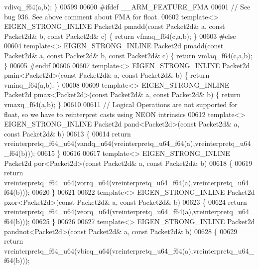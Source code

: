 \begin{DoxyCode}
{{      vdivq\_f64(a,b); \}
00599 
00600 \textcolor{preprocessor}{#ifdef \_\_ARM\_FEATURE\_FMA}
00601 \textcolor{comment}{// See bug 936. See above comment about FMA for float.}
00602 \textcolor{keyword}{template}<> EIGEN\_STRONG\_INLINE Packet2d pmadd(\textcolor{keyword}{const} Packet2d& a, \textcolor{keyword}{const} Packet2d& b, \textcolor{keyword}{const} Packet2d& c) \{ \textcolor{keywordflow}{
      return} vfmaq\_f64(c,a,b); \}
00603 \textcolor{preprocessor}{#else}
00604 \textcolor{keyword}{template}<> EIGEN\_STRONG\_INLINE Packet2d pmadd(\textcolor{keyword}{const} Packet2d& a, \textcolor{keyword}{const} Packet2d& b, \textcolor{keyword}{const} Packet2d& c) \{ \textcolor{keywordflow}{
      return} vmlaq\_f64(c,a,b); \}
00605 \textcolor{preprocessor}{#endif}
00606 
00607 \textcolor{keyword}{template}<> EIGEN\_STRONG\_INLINE Packet2d pmin<Packet2d>(\textcolor{keyword}{const} Packet2d& a, \textcolor{keyword}{const} Packet2d& b) \{ \textcolor{keywordflow}{return} 
      vminq\_f64(a,b); \}
00608 
00609 \textcolor{keyword}{template}<> EIGEN\_STRONG\_INLINE Packet2d pmax<Packet2d>(\textcolor{keyword}{const} Packet2d& a, \textcolor{keyword}{const} Packet2d& b) \{ \textcolor{keywordflow}{return} 
      vmaxq\_f64(a,b); \}
00610 
00611 \textcolor{comment}{// Logical Operations are not supported for float, so we have to reinterpret casts using NEON intrinsics}
00612 \textcolor{keyword}{template}<> EIGEN\_STRONG\_INLINE Packet2d pand<Packet2d>(\textcolor{keyword}{const} Packet2d& a, \textcolor{keyword}{const} Packet2d& b)
00613 \{
00614   \textcolor{keywordflow}{return} vreinterpretq\_f64\_u64(vandq\_u64(vreinterpretq\_u64\_f64(a),vreinterpretq\_u64\_f64(b)));
00615 \}
00616 
00617 \textcolor{keyword}{template}<> EIGEN\_STRONG\_INLINE Packet2d por<Packet2d>(\textcolor{keyword}{const} Packet2d& a, \textcolor{keyword}{const} Packet2d& b)
00618 \{
00619   \textcolor{keywordflow}{return} vreinterpretq\_f64\_u64(vorrq\_u64(vreinterpretq\_u64\_f64(a),vreinterpretq\_u64\_f64(b)));
00620 \}
00621 
00622 \textcolor{keyword}{template}<> EIGEN\_STRONG\_INLINE Packet2d pxor<Packet2d>(\textcolor{keyword}{const} Packet2d& a, \textcolor{keyword}{const} Packet2d& b)
00623 \{
00624   \textcolor{keywordflow}{return} vreinterpretq\_f64\_u64(veorq\_u64(vreinterpretq\_u64\_f64(a),vreinterpretq\_u64\_f64(b)));
00625 \}
00626 
00627 \textcolor{keyword}{template}<> EIGEN\_STRONG\_INLINE Packet2d pandnot<Packet2d>(\textcolor{keyword}{const} Packet2d& a, \textcolor{keyword}{const} Packet2d& b)
00628 \{
00629   \textcolor{keywordflow}{return} vreinterpretq\_f64\_u64(vbicq\_u64(vreinterpretq\_u64\_f64(a),vreinterpretq\_u64\_f64(b)));
}}
\end{DoxyCode}
